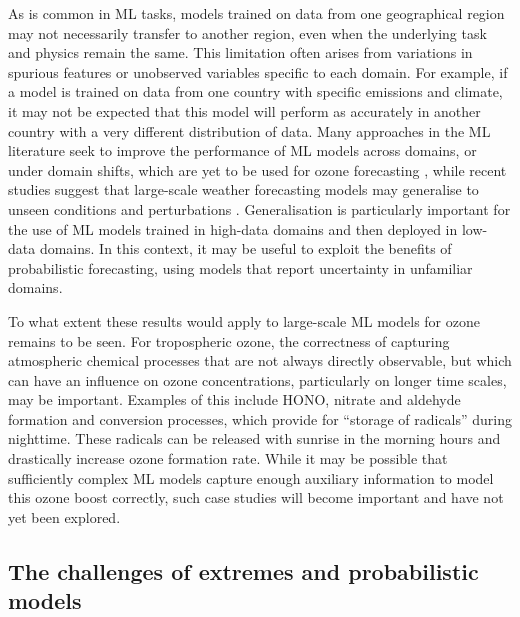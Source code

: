 \documentclass[gmd, manuscript]{copernicus}
\begin{document}
As is common in ML tasks, models trained on data from one geographical region may not necessarily transfer to another region, even when the underlying task and physics remain the same. This limitation often arises from variations in spurious features or unobserved variables specific to each domain. For example, if a model is trained on data from one country with specific emissions and climate, it may not be expected that this model will perform as accurately in another country with a very different distribution of data. Many approaches in the ML literature seek to improve the performance of ML models across domains, or under domain shifts, which are yet to be used for ozone forecasting \citep{Sagawa2019}, while recent studies suggest that large-scale weather forecasting models may generalise to unseen conditions and perturbations \citep{Hakim2024}. Generalisation is particularly important for the use of ML models trained in high-data domains and then deployed in low-data domains. In this context, it may be useful to exploit the benefits of probabilistic forecasting, using models that report uncertainty in unfamiliar domains.

To what extent these results would apply to large-scale ML models for ozone remains to be seen. For tropospheric ozone, the correctness of capturing atmospheric chemical processes that are not always directly observable, but which can have an influence on ozone concentrations, particularly on longer time scales, may be important. Examples of this include HONO, nitrate and aldehyde formation and conversion processes, which provide for “storage of radicals” during nighttime. These radicals can be released with sunrise in the morning hours and drastically increase ozone formation rate. While it may be possible that sufficiently complex ML models capture enough auxiliary information to model this ozone boost correctly, such case studies will become important and have not yet been explored. 

\subsection{The challenges of extremes and probabilistic models}
\end{document}
